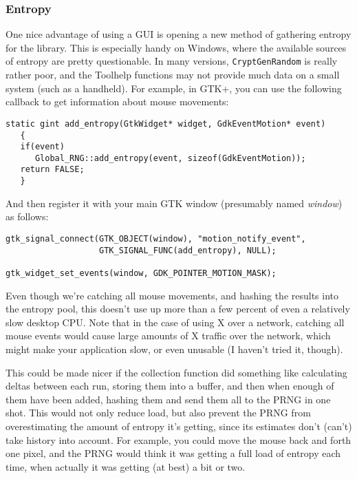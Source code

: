 \documentclass{article}
\newcommand{\variable}[1]{\textsl{#1}}
\begin{document}
\subsubsection{Entropy}

One nice advantage of using a GUI is opening a new method of gathering entropy
for the library. This is especially handy on Windows, where the available
sources of entropy are pretty questionable. In many versions,
\texttt{CryptGenRandom} is really rather poor, and the Toolhelp functions may
not provide much data on a small system (such as a handheld). For example, in
GTK+, you can use the following callback to get information about mouse
movements:

\begin{verbatim}
static gint add_entropy(GtkWidget* widget, GdkEventMotion* event)
   {
   if(event)
      Global_RNG::add_entropy(event, sizeof(GdkEventMotion));
   return FALSE;
   }
\end{verbatim}

And then register it with your main GTK window (presumably named
\variable{window}) as follows:

\begin{verbatim}
gtk_signal_connect(GTK_OBJECT(window), "motion_notify_event",
                   GTK_SIGNAL_FUNC(add_entropy), NULL);

gtk_widget_set_events(window, GDK_POINTER_MOTION_MASK);
\end{verbatim}

Even though we're catching all mouse movements, and hashing the results into
the entropy pool, this doesn't use up more than a few percent of even a
relatively slow desktop CPU. Note that in the case of using X over a network,
catching all mouse events would cause large amounts of X traffic over the
network, which might make your application slow, or even unusable (I haven't
tried it, though).

This could be made nicer if the collection function did something like
calculating deltas between each run, storing them into a buffer, and then when
enough of them have been added, hashing them and send them all to the PRNG in
one shot. This would not only reduce load, but also prevent the PRNG from
overestimating the amount of entropy it's getting, since its estimates don't
(can't) take history into account. For example, you could move the mouse back
and forth one pixel, and the PRNG would think it was getting a full load of
entropy each time, when actually it was getting (at best) a bit or two.
\end{document}
